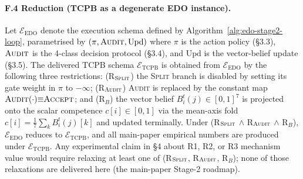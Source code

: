 \paragraph{F.4 Reduction (TCPB as a degenerate EDO instance).} Let $\mathcal{E}_{\mathrm{EDO}}$ denote the execution schema defined by Algorithm~\ref{alg:edo-stage2-loop}, parametrised by $(\pi, \textsc{Audit}, \mathrm{Upd})$ where $\pi$ is the action policy (\S 3.3), $\textsc{Audit}$ is the 4-class decision protocol (\S 3.4), and $\mathrm{Upd}$ is the vector-belief update (\S 3.5). The delivered TCPB schema $\mathcal{E}_{\mathrm{TCPB}}$ is obtained from $\mathcal{E}_{\mathrm{EDO}}$ by the following three restrictions: (R$_\textsc{Split}$) the \textsc{Split} branch is disabled by setting its gate weight in $\pi$ to $-\infty$; (R$_\textsc{Audit}$) \textsc{Audit} is replaced by the constant map $\textsc{Audit}(\cdot){\equiv}\textsc{Accept}$; and (R$_B$) the vector belief $B_i^t(j)\in[0,1]^{7}$ is projected onto the scalar competence $c[i]\in[0,1]$ via the mean-axis fold $c[i]{=}\tfrac{1}{7}\sum_{k}B_i^t(j)[k]$ and updated terminally. Under (R$_\textsc{Split}$ $\land$ R$_\textsc{Audit}$ $\land$ R$_B$), $\mathcal{E}_{\mathrm{EDO}}$ reduces to $\mathcal{E}_{\mathrm{TCPB}}$, and all main-paper empirical numbers are produced under $\mathcal{E}_{\mathrm{TCPB}}$. Any experimental claim in \S 4 about R1, R2, or R3 mechanism value would require relaxing at least one of (R$_\textsc{Split}$, R$_\textsc{Audit}$, R$_B$); none of those relaxations are delivered here (the main-paper Stage-2 roadmap).

